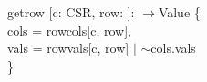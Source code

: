 \begin{myquote}
\Bfun getrow [c: CSR, row: \Bint]: \Bint$\rightarrow$Value \{\\
\TA \Blet cols = rowcols[c, row],\\
\TB vals = rowvals[c, row] $|$ $\sim$cols.vals\\
\}
\end{myquote}